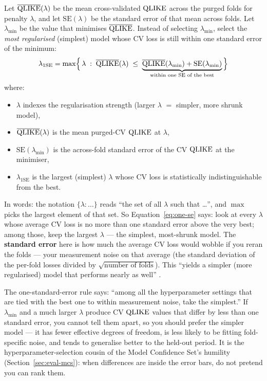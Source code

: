 \begin{keyidea}
Let $\overline{\operatorname{QLIKE}}(\lambda)$ be the mean cross-validated $\operatorname{QLIKE}$ across the purged folds for penalty $\lambda$, and let $\mathrm{SE}(\lambda)$ be the standard error of that mean across folds.
Let $\lambda_{\min}$ be the value that minimises $\overline{\operatorname{QLIKE}}$.
Instead of selecting $\lambda_{\min}$, select the \emph{most regularised} (simplest) model whose CV loss is still within one standard error of the minimum:
\begin{equation}
\label{eq:one-se}
\lambda_{\text{1SE}} = \max\Bigl\{\,\lambda \;:\; \overline{\operatorname{QLIKE}}(\lambda) \;\leq\; \underbrace{\overline{\operatorname{QLIKE}}(\lambda_{\min}) + \mathrm{SE}(\lambda_{\min})}_{\text{within one SE of the best}} \,\Bigr\}
\end{equation}
where:
\begin{itemize}[nosep]
  \item $\lambda$ indexes the regularisation strength (larger $\lambda$ $=$ simpler, more shrunk model),
  \item $\overline{\operatorname{QLIKE}}(\lambda)$ is the mean purged-CV $\operatorname{QLIKE}$ at $\lambda$,
  \item $\mathrm{SE}(\lambda_{\min})$ is the across-fold standard error of the CV $\operatorname{QLIKE}$ at the minimiser,
  \item $\lambda_{\text{1SE}}$ is the largest (simplest) $\lambda$ whose CV loss is statistically indistinguishable from the best.
\end{itemize}
In words: the notation $\{\lambda : \ldots\}$ reads ``the set of all $\lambda$ such that \ldots'', and $\max$ picks the largest element of that set. So Equation~\eqref{eq:one-se} says: look at every $\lambda$ whose average CV loss is no more than one standard error above the very best; among those, keep the largest $\lambda$ --- the simplest, most-shrunk model.
The \textbf{standard error} here is how much the average CV loss would wobble if you reran the folds --- your measurement noise on that average (the standard deviation of the per-fold losses divided by $\sqrt{\text{number of folds}}$).
This ``yields a simpler (more regularised) model that performs nearly as well'' \citep[the one-standard-error rule predates this source, originating with Breiman et al.\ (CART, 1984) and Hastie, Tibshirani \& Friedman, ESL;][applies it in the purged-CV setting]{LopezdePrado2018}.
\end{keyidea}

\begin{intuition}
The one-standard-error rule says: ``among all the hyperparameter settings that are tied with the best one to within measurement noise, take the simplest.''
If $\lambda_{\min}$ and a much larger $\lambda$ produce CV $\operatorname{QLIKE}$ values that differ by less than one standard error, you cannot tell them apart, so you should prefer the simpler model --- it has fewer effective degrees of freedom, is less likely to be fitting fold-specific noise, and tends to generalise better to the held-out period.
It is the hyperparameter-selection cousin of the Model Confidence Set's humility (Section~\ref{sec:eval-mcs}): when differences are inside the error bars, do not pretend you can rank them.
\end{intuition}

